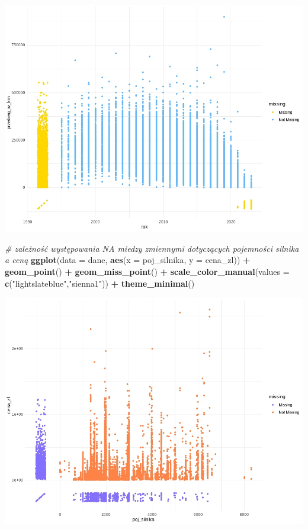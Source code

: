 \documentclass[
]{article}
\newenvironment{Shaded}{\begin{snugshade}}{\end{snugshade}}
\newcommand{\AttributeTok}[1]{\textcolor[rgb]{0.13,0.29,0.53}{#1}}
\newcommand{\CommentTok}[1]{\textcolor[rgb]{0.56,0.35,0.01}{\textit{#1}}}
\newcommand{\FunctionTok}[1]{\textcolor[rgb]{0.13,0.29,0.53}{\textbf{#1}}}
\newcommand{\NormalTok}[1]{#1}
\newcommand{\SpecialCharTok}[1]{\textcolor[rgb]{0.81,0.36,0.00}{\textbf{#1}}}
\newcommand{\StringTok}[1]{\textcolor[rgb]{0.31,0.60,0.02}{#1}}
\begin{document}
\includegraphics[width=1\linewidth]{images/5}

\begin{Shaded}
\begin{Highlighting}[]
\CommentTok{\# zależność występowania NA miedzy zmiennymi dotyczących pojemności silnika a ceną }
\FunctionTok{ggplot}\NormalTok{(}\AttributeTok{data =}\NormalTok{ dane, }\FunctionTok{aes}\NormalTok{(}\AttributeTok{x =}\NormalTok{ poj\_silnika, }\AttributeTok{y =}\NormalTok{ cena\_zl)) }\SpecialCharTok{+} 
  \FunctionTok{geom\_point}\NormalTok{() }\SpecialCharTok{+}
  \FunctionTok{geom\_miss\_point}\NormalTok{() }\SpecialCharTok{+}
  \FunctionTok{scale\_color\_manual}\NormalTok{(}\AttributeTok{values =} \FunctionTok{c}\NormalTok{(}\StringTok{"lightslateblue"}\NormalTok{,}\StringTok{"sienna1"}\NormalTok{)) }\SpecialCharTok{+}
  \FunctionTok{theme\_minimal}\NormalTok{()}
\end{Highlighting}
\end{Shaded}

\includegraphics[width=1\linewidth]{images/6}
\end{document}
